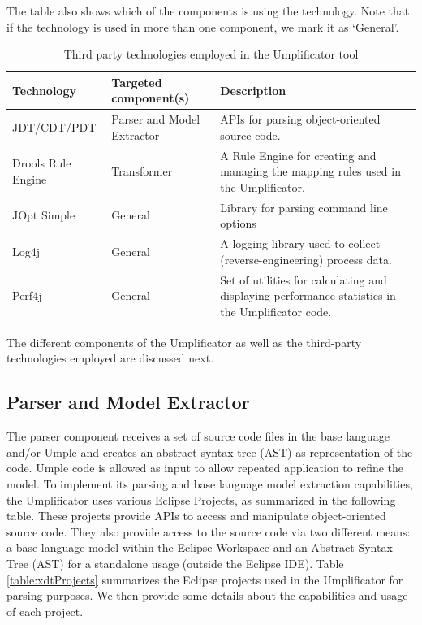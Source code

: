 The table also shows which of the components is using the technology. Note that if the technology is used in more than one component, we mark it as `General'.

\begin{table}[h]
\caption{Third party technologies employed in the Umplificator tool}
\label{table:technologies}
\begin{tabular}{l|l|p{6cm}}
\toprule
\rowcolor[HTML]{BBDAFF}
\textbf{Technology} & \textbf{Targeted component(s)}  & \textbf{Description}  \\ \midrule
JDT/CDT/PDT  & Parser and Model Extractor & APIs for parsing object-oriented source code.\\ \hline 
Drools Rule Engine & Transformer  & A Rule Engine for creating and managing the mapping rules used in the Umplificator.	 \\ \hline	
JOpt Simple & General  & Library for parsing command line options \\ \hline	
Log4j & General & A logging library used to collect (reverse-engineering) process data.	\\ \hline	
Perf4j & General & Set of utilities for calculating and displaying performance statistics in the Umplificator code. \\ \bottomrule
\end{tabular}
\end{table}

The different components of the Umplificator as well as the third-party technologies employed are discussed next. 

\subsection{Parser and Model Extractor}

The parser component receives a set of source code files in the base language and/or Umple and creates an abstract syntax tree (AST) as representation of the code. Umple code is allowed as input to allow repeated application to refine the model. To implement its parsing and base language model extraction capabilities, the Umplificator uses various Eclipse Projects, as summarized in the following table. These projects provide APIs to access and manipulate object-oriented source code.
They also provide access to the  source code via two different means: a base language model within the Eclipse Workspace and an Abstract Syntax Tree (AST) for a standalone usage (outside the Eclipse IDE). Table \ref{table:xdtProjects} summarizes the Eclipse projects used in the Umplificator for parsing purposes. We then provide some details about the capabilities and usage of each project. 

